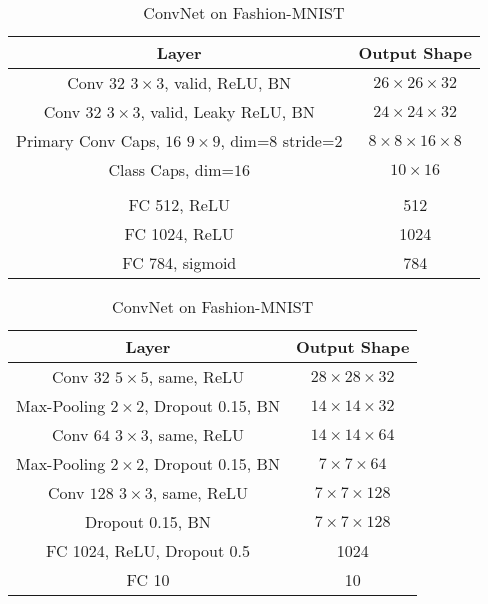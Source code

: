 \begin{table}

	\caption{CapsNet on Fashion-MNIST}
	\begin{tabular}{|c|c|}
		\hline 
		Layer	& Output Shape \\ 
		\hline 
		Conv $32$ $3\times3$, valid, ReLU, BN	&  $26\times26\times32$ \\ 
		\hline 
		Conv $32$ $3\times3$, valid, Leaky ReLU, BN	&  $24\times24\times32$\\ 
		\hline 
		Primary Conv Caps, $16$ $9\times9$, dim=$8$	stride=$2$ &  $8\times8\times16\times8$\\ 
		\hline 
		Class Caps, dim=$16$	&  $10\times16$\\ 
		\hline 
		& \\
		\hline
		FC 512, ReLU	& 512 \\
		\hline
		FC 1024, ReLU	& 1024 \\
		\hline
		FC 784, sigmoid	& 784 \\
		\hline
	\end{tabular}

	\caption{ConvNet on Fashion-MNIST}
	\begin{tabular}{|c|c|}
		\hline 
		Layer	&  Output Shape \\ 
		\hline 
		Conv $32$ $5\times5$, same,	ReLU & $28\times28\times32$ \\ 
		\hline 
		Max-Pooling $2\times2$, Dropout 0.15, BN	&  $14\times14\times32$ \\ 
		\hline 
		Conv $64$ $3\times3$, same, ReLU	& $14\times14\times64$ \\ 
		\hline 
		Max-Pooling $2\times2$, Dropout 0.15, BN	& $7\times7\times64$ \\
		\hline
		Conv $128$ $3\times3$, same, ReLU	& $7\times7\times128$ \\
		\hline
		Dropout 0.15, BN	& $7\times7\times128$ \\
		\hline
		FC 1024, ReLU, Dropout 0.5 & 1024 \\
		\hline
		FC 10 & 10\\
		\hline
	\end{tabular} 

\end{table}

